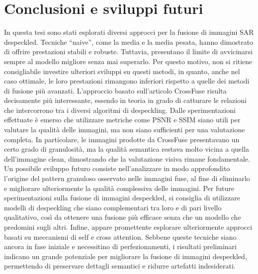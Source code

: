 
\chapter{Conclusioni e sviluppi futuri}
In questa tesi sono stati esplorati diversi approcci per la fusione di immagini SAR despeckled. 
Tecniche “naive”, come la media e la media pesata, hanno dimostrato di offrire prestazioni stabili e 
robuste. Tuttavia, presentano il limite di avvicinarsi sempre al modello migliore senza mai superarlo. 
Per questo motivo, non si ritiene consigliabile investire ulteriori sviluppi su questi metodi, 
in quanto, anche nel caso ottimale, le loro prestazioni rimangono inferiori rispetto a quelle dei 
metodi di fusione più avanzati.
L’approccio basato sull’articolo CrossFuse risulta decisamente più interessante, 
essendo in teoria in grado di catturare le relazioni che intercorrono tra i diversi algoritmi di 
despeckling.
Dalle sperimentazioni effettuate è emerso che utilizzare metriche come PSNR e SSIM siano 
utili per valutare la qualità delle immagini, ma non siano sufficienti per una valutazione 
completa. In particolare, le immagini prodotte da CrossFuse presentavano un certo grado di 
granulosità, ma la qualità semantica restava molto vicina a quella dell’immagine clean, 
dimostrando che la valutazione visiva rimane fondamentale.
Un possibile sviluppo futuro consiste nell’analizzare in modo approfondito 
l’origine del pattern granuloso osservato nelle immagini fuse, al fine di eliminarlo e 
migliorare ulteriormente la qualità complessiva delle immagini.
Per future sperimentazioni sulla fusione di immagini despeckled, si consiglia di utilizzare 
modelli di despeckling che siano complementari tra loro e di pari livello qualitativo, 
così da ottenere una fusione più efficace senza che un modello che predomini sugli altri.
Infine, appare promettente esplorare ulteriormente approcci basati su meccanismi di self e 
cross attention. Sebbene queste tecniche siano ancora in fase iniziale e necessitino di 
perfezionamenti, i risultati preliminari indicano un grande potenziale per migliorare la 
fusione di immagini despeckled, permettendo di preservare dettagli semantici e ridurre artefatti indesiderati.